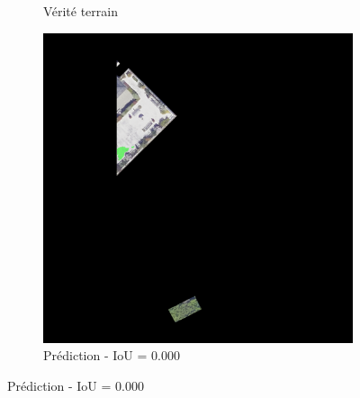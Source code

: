 \begin{figure}[H]
\begin{subfigure}{0.32\textwidth}
    \caption{Vérité terrain}
\end{subfigure}
\hfill
\begin{subfigure}{0.32\textwidth}
    \includegraphics[width=\textwidth]{02-main//figures/ch4/kfold_ensembles/segformer_tu-regnety_080.ra3_in1k/worst_cases/worst_3_iou0.000_24991122_tile_9_19_7ebcec_overlay_pred.png}
    \caption{Prédiction - IoU = 0.000}
\end{subfigure}

\vspace{0.35cm}


\end{figure}
